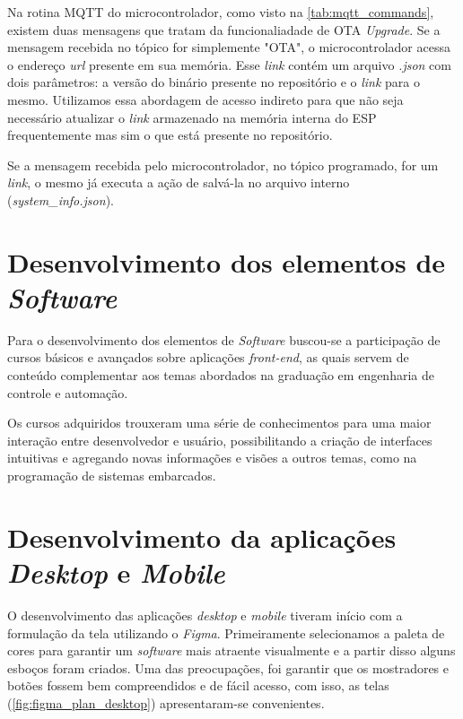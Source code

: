 Na rotina MQTT do microcontrolador, como visto na \autoref{tab:mqtt_commands}, existem duas mensagens que tratam da funcionaliadade de OTA \textit{Upgrade}. Se a mensagem recebida no tópico for simplemente "OTA", o microcontrolador acessa o endereço \textit{url} presente em sua memória. Esse \textit{link} contém um arquivo \textit{.json} com dois parâmetros: a versão do binário presente no repositório e o \textit{link} para o mesmo. Utilizamos essa abordagem de acesso indireto para que não seja necessário atualizar o \textit{link} armazenado na memória interna do ESP frequentemente mas sim o que está presente no repositório.

Se a mensagem recebida pelo microcontrolador, no tópico programado, for um \textit{link}, o mesmo já executa a ação de salvá-la no arquivo interno (\textit{system\_info.json}).






\section{Desenvolvimento dos elementos de \textit{Software}}


Para o desenvolvimento dos elementos de \textit{Software} buscou-se a participação de cursos básicos e avançados sobre aplicações \textit{front-end}, as quais servem de conteúdo complementar aos temas abordados na graduação em engenharia de controle e automação.

Os cursos adquiridos trouxeram uma série de conhecimentos para uma maior interação entre desenvolvedor e usuário, possibilitando a criação de interfaces intuitivas e agregando novas informações e visões a outros temas, como na programação de sistemas embarcados.




\section{Desenvolvimento da aplicações \textit{Desktop} e \textit{Mobile}}

O desenvolvimento das aplicações \textit{desktop} e \textit{mobile} tiveram início com a formulação da tela utilizando o \textit{Figma}. Primeiramente selecionamos a paleta de cores para garantir um \textit{software} mais atraente visualmente e a partir disso alguns esboços foram criados. Uma das preocupações, foi garantir que os mostradores e botões fossem bem compreendidos e de fácil acesso, com isso, as telas (\autoref{fig:figma_plan_desktop}) apresentaram-se convenientes.

